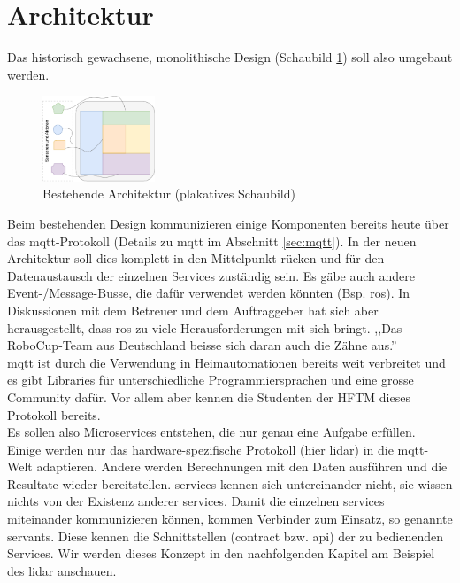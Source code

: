 \section{Architektur}
\label{sec:Architektur}
Das historisch gewachsene, monolithische Design (Schaubild \ref{fig:architecture_current_highlevel}) soll also umgebaut werden.
\begin{figure}[H]
	\centering
	\includegraphics[width=0.3\textwidth]{img/architecture-highlevel-today.pdf}
	\caption{Bestehende Architektur (plakatives Schaubild)}
	\label{fig:architecture_current_highlevel}
\end{figure}
Beim bestehenden Design kommunizieren einige Komponenten bereits heute über das \acrshort{mqtt}-Protokoll (Details zu \acrshort{mqtt} im Abschnitt \ref{sec:mqtt}). In der neuen Architektur soll dies komplett in den Mittelpunkt rücken und für den Datenaustausch der einzelnen Services zuständig sein. Es gäbe auch andere Event-/Message-Busse, die dafür verwendet werden könnten (Bsp. \Gls{ros}). In Diskussionen mit dem Betreuer und dem Auftraggeber hat sich aber herausgestellt, dass \Gls{ros} zu viele Herausforderungen mit sich bringt. ,,Das RoboCup-Team aus Deutschland beisse sich daran auch die Zähne aus.'' \\
\acrshort{mqtt} ist durch die Verwendung in Heimautomationen bereits weit verbreitet und es gibt Libraries für unterschiedliche Programmiersprachen und eine grosse Community dafür. Vor allem aber kennen die Studenten der HFTM dieses Protokoll bereits. \\ Es sollen also Microservices entstehen, die nur genau eine Aufgabe erfüllen. Einige werden nur das hardware-spezifische Protokoll (hier \acrshort{lidar}) in die \acrshort{mqtt}-Welt adaptieren. Andere werden Berechnungen mit den Daten ausführen und die Resultate wieder bereitstellen. \Glspl{service} kennen sich untereinander nicht, sie wissen nichts von der Existenz anderer \glspl{service}. Damit die einzelnen \Glspl{service} miteinander kommunizieren können, kommen Verbinder zum Einsatz,  so genannte \Glspl{servant}. Diese kennen die Schnittstellen (\gls{contract} bzw. \acrshort{api}) der zu bedienenden Services. Wir werden dieses Konzept in den nachfolgenden Kapitel am Beispiel des \acrshort{lidar} anschauen.

